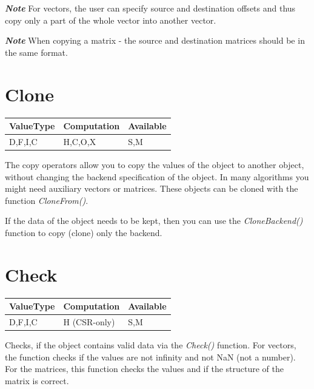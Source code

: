 

\textbf{\emph{Note}} For vectors, the user can specify source and destination offsets and thus copy only a part of the whole vector into another vector.

\textbf{\emph{Note}} When copying a matrix - the source and destination matrices should be in the same format.
 
\section{Clone}

\begin{table}[H]
\begin{tabular}{l|l|l}
\multicolumn{1}{c|}{ValueType} & Computation & Available \\ \hline
D,F,I,C                        & H,C,O,X     & S,M    
\end{tabular}
\end{table}

The copy operators allow you to copy the values of the object to another object, without changing the backend specification of the object. In many algorithms you might need auxiliary vectors or matrices. These objects can be cloned with the function \emph{CloneFrom()}.



If the data of the object needs to be kept, then you can use the \emph{CloneBackend()} function to copy (clone) only the backend.



\section{Check}

\begin{table}[H]
\begin{tabular}{l|l|l}
\multicolumn{1}{c|}{ValueType} & Computation & Available \\ \hline
D,F,I,C                        & H (CSR-only)& S,M    
\end{tabular}
\end{table}

Checks, if the object contains valid data via the \emph{Check()} function. For vectors, the function checks if the values are not infinity and not NaN (not a number). For the matrices, this function checks the values and if the structure of the matrix is correct.


